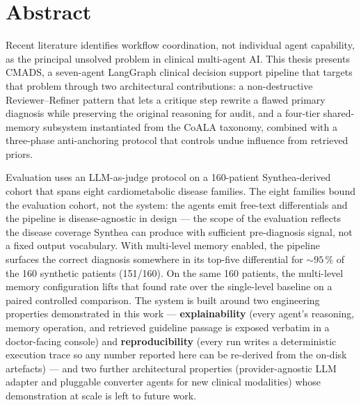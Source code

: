\chapter*{Abstract}

Recent literature identifies workflow coordination, not individual
agent capability, as the principal unsolved problem in clinical
multi-agent AI. This thesis presents CMADS, a seven-agent LangGraph
clinical decision support pipeline that targets that problem through
two architectural contributions: a non-destructive Reviewer--Refiner
pattern that lets a critique step rewrite a flawed primary diagnosis
while preserving the original reasoning for audit, and a four-tier
shared-memory subsystem instantiated from the CoALA taxonomy,
combined with a three-phase anti-anchoring protocol that controls
undue influence from retrieved priors.

Evaluation uses an LLM-as-judge protocol on a 160-patient
Synthea-derived cohort that spans eight cardiometabolic disease
families. The eight families bound the evaluation cohort, not the
system: the agents emit free-text differentials and the pipeline is
disease-agnostic in design --- the scope of the evaluation reflects
the disease coverage Synthea can produce with sufficient
pre-diagnosis signal, not a fixed output vocabulary.
With multi-level memory enabled, the pipeline surfaces the correct
diagnosis somewhere in its top-five differential for $\sim 95\,\%$
of the 160 synthetic patients (151/160). On the same 160 patients,
the multi-level memory configuration lifts that found rate over the
single-level baseline on a paired controlled comparison.
The system is built around two engineering properties demonstrated
in this work --- \textbf{explainability} (every agent's reasoning,
memory operation, and retrieved guideline passage is exposed
verbatim in a doctor-facing console) and \textbf{reproducibility}
(every run writes a deterministic execution trace so any number
reported here can be re-derived from the on-disk artefacts) --- and
two further architectural properties (provider-agnostic LLM adapter
and pluggable converter agents for new clinical modalities) whose
demonstration at scale is left to future work.

